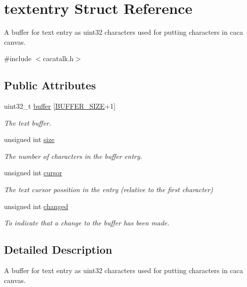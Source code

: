 \hypertarget{structtextentry}{\section{textentry \-Struct \-Reference}
\label{structtextentry}
}


\-A buffer for text entry as uint32 characters used for putting characters in caca canvas.  




{\ttfamily \#include $<$cacatalk.\-h$>$}

\subsection*{\-Public \-Attributes}
\begin{DoxyCompactItemize}
\item 
uint32\-\_\-t \hyperlink{structtextentry_aa504334ee4b52796c93d25e10784d29e}{buffer} \mbox{[}\hyperlink{cacatalk_8h_a6b20d41d6252e9871430c242cb1a56e7}{\-B\-U\-F\-F\-E\-R\-\_\-\-S\-I\-Z\-E}+1\mbox{]}
\begin{DoxyCompactList}\small\item\em \-The text buffer. \end{DoxyCompactList}\item 
unsigned int \hyperlink{structtextentry_a56e0baee961740d8bd5e0974e94af85a}{size}
\begin{DoxyCompactList}\small\item\em \-The number of characters in the buffer entry. \end{DoxyCompactList}\item 
unsigned int \hyperlink{structtextentry_a61cdc6b8c0bede44adf1f61fa347e7bc}{cursor}
\begin{DoxyCompactList}\small\item\em \-The text cursor possition in the entry (relative to the first character) \end{DoxyCompactList}\item 
unsigned int \hyperlink{structtextentry_a5af018f6c56b4ae3f60674c70226cec7}{changed}
\begin{DoxyCompactList}\small\item\em \-To indicate that a change to the buffer has been made. \end{DoxyCompactList}\end{DoxyCompactItemize}


\subsection{\-Detailed \-Description}
\-A buffer for text entry as uint32 characters used for putting characters in caca canvas. 

